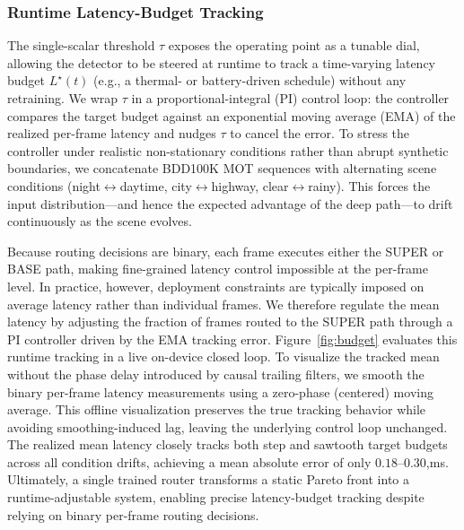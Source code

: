 \subsubsection{Runtime Latency-Budget Tracking}
\label{sec:results_budget}
The single-scalar threshold $\tau$ exposes the operating point as a tunable dial, allowing the detector to be steered at runtime to track a time-varying latency budget $L^\star(t)$ (e.g., a thermal- or battery-driven schedule) without any retraining. 
We wrap $\tau$ in a proportional-integral (PI) control loop: the controller compares the target budget against an exponential moving average (EMA) of the realized per-frame latency and nudges $\tau$ to cancel the error. 
To stress the controller under realistic non-stationary conditions rather than abrupt synthetic boundaries, we concatenate BDD100K MOT sequences with alternating scene conditions (night$\leftrightarrow$daytime, city$\leftrightarrow$highway, clear$\leftrightarrow$rainy). 
This forces the input distribution---and hence the expected advantage of the deep path---to drift continuously as the scene evolves.

Because routing decisions are binary, each frame executes either the SUPER or BASE path, making fine-grained latency control impossible at the per-frame level. 
In practice, however, deployment constraints are typically imposed on average latency rather than individual frames. 
We therefore regulate the mean latency by adjusting the fraction of frames routed to the SUPER path through a PI controller driven by the EMA tracking error.
Figure~\ref{fig:budget} evaluates this runtime tracking in a live on-device closed loop. 
To visualize the tracked mean without the phase delay introduced by causal trailing filters, we smooth the binary per-frame latency measurements using a zero-phase (centered) moving average. 
This offline visualization preserves the true tracking behavior while avoiding smoothing-induced lag, leaving the underlying control loop unchanged.
The realized mean latency closely tracks both step and sawtooth target budgets across all condition drifts, achieving a mean absolute error of only $0.18$--$0.30$,ms. 
Ultimately, a single trained router transforms a static Pareto front into a runtime-adjustable system, enabling precise latency-budget tracking despite relying on binary per-frame routing decisions.


